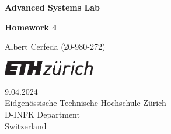 \documentclass[tikz,14pt,fleqn]{article}
\newcommand\namesurname{Albert Cerfeda (20-980-272)}
\newcommand\assignment{Homework 4}
\newcommand\subject{Advanced Systems Lab}
\newcommand\documentdate{9.04.2024}
\begin{document}
\begin{titlepage}
   \begin{center}
       \vspace*{0.2cm}

       \textbf{\Large{\subject}}

       \vspace{0.5cm}
        \textbf{\assignment}\\[5mm]
        
            
       \vspace{0.4cm}

        \namesurname
        \begin{figure}[H]
            \centering
        \end{figure}
       \tableofcontents

       \vspace*{\fill}
     
        \includegraphics[width=0.3\textwidth]{fig/eth_logo_kurz_pos.eps}
       
        \documentdate \\
        Eidgenössische Technische Hochschule Zürich\\
        D-INFK Department\\
        Switzerland\\

   \end{center}
\end{titlepage}


\end{document}

